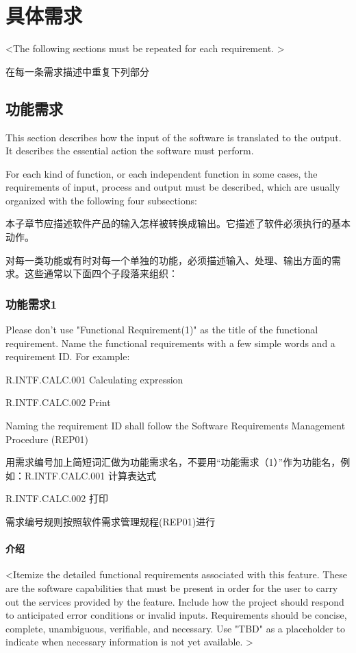 \chapter{具体需求}
<The following sections must be repeated for each requirement. >

在每一条需求描述中重复下列部分
\section{功能需求}
This section describes how the input of the software is translated to the output. It describes the essential action the software must perform.

For each kind of function, or each independent function in some cases, the requirements of input, process and output must be described, which are usually organized with the following four subsections:

本子章节应描述软件产品的输入怎样被转换成输出。它描述了软件必须执行的基本动作。 

对每一类功能或有时对每一个单独的功能，必须描述输入、处理、输出方面的需求。这些通常以下面四个子段落来组织：
\subsection{功能需求1}
Please don't use "Functional Requirement(1)" as the title of the functional requirement. Name the functional requirements with a few simple words and a requirement ID.  For example:

R.INTF.CALC.001 Calculating expression

R.INTF.CALC.002 Print

Naming the requirement ID shall follow the Software Requirements Management Procedure (REP01)

用需求编号加上简短词汇做为功能需求名，不要用“功能需求（1）”作为功能名，例如：R.INTF.CALC.001 计算表达式

R.INTF.CALC.002 打印

需求编号规则按照软件需求管理规程(REP01)进行
\subsubsection{介绍}
<Itemize the detailed functional requirements associated with this feature. These are the software capabilities that must be present in order for the user to carry out the services provided by the feature.  Include how the project should respond to anticipated error conditions or invalid inputs. Requirements should be concise, complete, unambiguous, verifiable, and necessary. Use "TBD" as a placeholder to indicate when necessary information is not yet available. >

